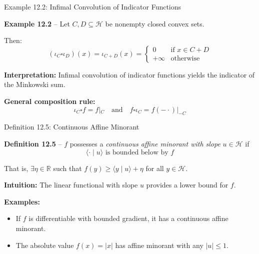 \documentclass[aspectratio=169,10pt]{beamer}
\newcommand{\cH}{\mathcal{H}}
\newcommand{\R}{\mathbb{R}}
\newcommand{\co}{\square}
\begin{document}
\begin{frame}{Example 12.2: Infimal Convolution of Indicator Functions}

  \textbf{Example 12.2} -- Let $C, D \subseteq \cH$ be nonempty closed convex sets.

  Then:
  \[
    (\iota_C \co \iota_D)(x) = \iota_{C+D}(x) = \begin{cases}
      0 & \text{if } x \in C + D \\
      +\infty & \text{otherwise}
    \end{cases}
  \]

  \vspace{0.3cm}

  \textbf{Interpretation:} Infimal convolution of indicator functions
  yields the indicator of the Minkowski sum.

  \vspace{0.5cm}

  \textbf{General composition rule:}
  \[
    \iota_C \co f = f|_C \quad \text{and} \quad f \co \iota_C = f(-\cdot)|_{-C}
  \]

\end{frame}

\begin{frame}{Definition 12.5: Continuous Affine Minorant}

  \textbf{Definition 12.5} -- $f$ possesses a \textit{continuous affine
  minorant with slope} $u \in \cH$ if
  \[
    \langle \cdot \mid u \rangle \text{ is bounded below by } f
  \]

  That is, $\exists \eta \in \R$ such that $f(y) \geq \langle y \mid u \rangle + \eta$ for all $y \in \cH$.

  \vspace{1cm}

  \textbf{Intuition:} The linear functional with slope $u$ provides a lower bound for $f$.

  \vspace{1cm}

  \textbf{Examples:}
  \begin{itemize}
    \item If $f$ is differentiable with bounded gradient, it has a continuous
      affine minorant.
    \item The absolute value $f(x) = |x|$ has affine minorant with any $|u| \le 1$.
  \end{itemize}

\end{frame}
\end{document}
